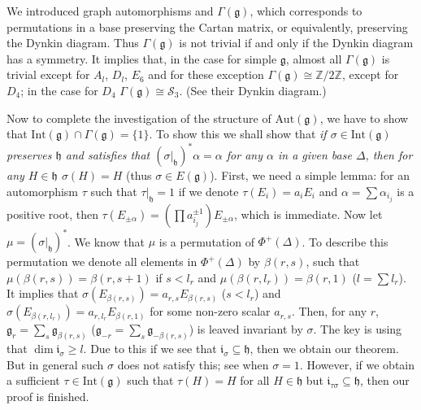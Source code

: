 \documentclass{article}
\newcommand{\InZ}{\mathbb{Z}}
\newcommand{\lie}[1]{\mathfrak{#1}}
\begin{document}
We introduced graph automorphisms and $\Gamma(\lie{g})$, which corresponds to permutations in a base preserving the Cartan matrix, or equivalently, preserving the Dynkin diagram.
Thus $\Gamma(\lie{g})$ is not trivial if and only if the Dynkin diagram has a symmetry.
It implies that, in the case for simple $\lie{g}$, almost all $\Gamma(\lie{g})$ is trivial except for $A_l$, $D_l$, $E_6$ and for these exception $\Gamma(\lie{g}) \cong \InZ/2\InZ$, except for $D_4$; in the case for $D_4$ $\Gamma(\lie{g}) \cong \mathcal{S}_3$.
(See their Dynkin diagram.)

Now to complete the investigation of the structure of $\textrm{Aut}(\lie{g})$, we have to show that $\textrm{Int}(\lie{g}) \cap \Gamma(\lie{g}) = \{1\}$.
To show this we shall show that \textit{if $\sigma \in \textrm{Int}(\lie{g})$ preserves $\lie{h}$ and satisfies that $(\sigma|_\lie{h})^* \alpha = \alpha$ for any $\alpha$ in a given base $\Delta$, then for any $H \in \lie{h}$ $\sigma(H) = H$} (thus $\sigma \in E(\lie{g})$).
First, we need a simple lemma: for an automorphism $\tau$ such that $\tau|_\lie{h} = 1$ if we denote $\tau(E_i) = a_i E_i$ and $\alpha = \sum \alpha_{i_j}$ is a positive root, then $\tau(E_{\pm \alpha}) = \left( \prod a_{i_j}^{\pm 1} \right) E_{\pm \alpha}$, which is immediate.
Now let $\mu = (\sigma|_\lie{h})^*$.
We know that $\mu$ is a permutation of $\Phi^+(\Delta)$.
To describe this permutation we denote all elements in $\Phi^+(\Delta)$ by $\beta(r, s)$, such that $\mu(\beta(r, s)) = \beta(r, s + 1)$ if $s < l_r$ and $\mu(\beta(r, l_r)) = \beta(r, 1)$ ($l = \sum l_r$).
It implies that $\sigma(E_{\beta(r, s)}) = a_{r, s} E_{\beta(r, s)}$ ($s < l_r$) and $\sigma(E_{\beta(r, l_r)}) = a_{r, l_r} E_{\beta(r, 1)}$ for some non-zero scalar $a_{r, s}$.
Then, for any $r$, $\lie{g}_r = \sum_s \lie{g}_{\beta(r, s)}$ ($\lie{g}_{-r} = \sum_s \lie{g}_{-\beta(r, s)}$) is leaved invariant by $\sigma$.
The key is using that $\dim{\lie{i}_\sigma} \ge l$.
Due to this if we see that $\lie{i}_\sigma \subseteq \lie{h}$, then we obtain our theorem.
But in general such $\sigma$ does not satisfy this; see when $\sigma = 1$.
However, if we obtain a sufficient $\tau \in \textrm{Int}(\lie{g})$ such that $\tau(H) = H$ for all $H \in \lie{h}$ but $\lie{i}_{\tau \sigma} \subseteq \lie{h}$, then our proof is finished.
\end{document}
